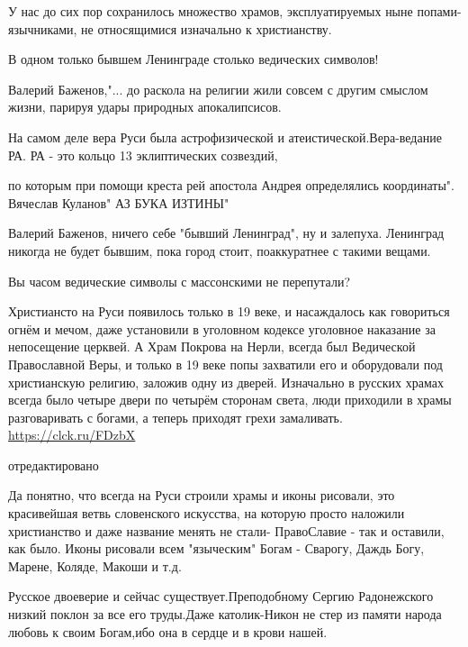 \begin{itemize}

У нас до сих пор сохранилось множество храмов, эксплуатируемых ныне
попами-язычниками, не относящимися изначально к христианству.

В одном только бывшем Ленинграде столько ведических символов!


Валерий Баженов,"... до раскола на религии жили совсем с другим смыслом жизни,
парируя удары природных апокалипсисов.

На самом деле вера Руси была астрофизической и атеистической.Вера-ведание РА.
РА - это кольцо 13 эклиптических созвездий,

по которым при помощи креста рей апостола Андрея определялись координаты".
Вячеслав Куланов" АЗ БУКА ИЗТИНЫ"


Валерий Баженов, ничего себе "бывший Ленинград", ну и залепуха. Ленинград
никогда не будет бывшим, пока город стоит, поаккуратнее с такими вещами.

Вы часом ведические символы с массонскими не перепутали?


Христиансто на Руси появилось только в 19 веке, и насаждалось как говориться
огнём и мечом, даже установили в уголовном кодексе уголовное наказание за
непосещение церквей. А Храм Покрова на Нерли, всегда был Ведической
Православной Веры, и только в 19 веке попы захватили его и оборудовали под
христианскую религию, заложив одну из дверей. Изначально в русских храмах
всегда было четыре двери по четырём сторонам света, люди приходили в храмы
разговаривать с богами, а теперь приходят грехи замаливать.
\url{https://clck.ru/FDzbX}

отредактировано

Да понятно, что всегда на Руси строили храмы и иконы рисовали, это красивейшая
ветвь словенского искусства, на которую просто наложили христианство и даже
название менять не стали- ПравоСлавие - так и оставили, как было. Иконы
рисовали всем "языческим" Богам - Сварогу, Даждь Богу, Марене, Коляде, Макоши и
т.д.


Русское двоеверие и сейчас существует.Преподобному Сергию Радонежского низкий
поклон за все его труды.Даже католик-Никон не стер из памяти народа любовь к
своим Богам,ибо она в сердце и в крови нашей.



\end{itemize}
